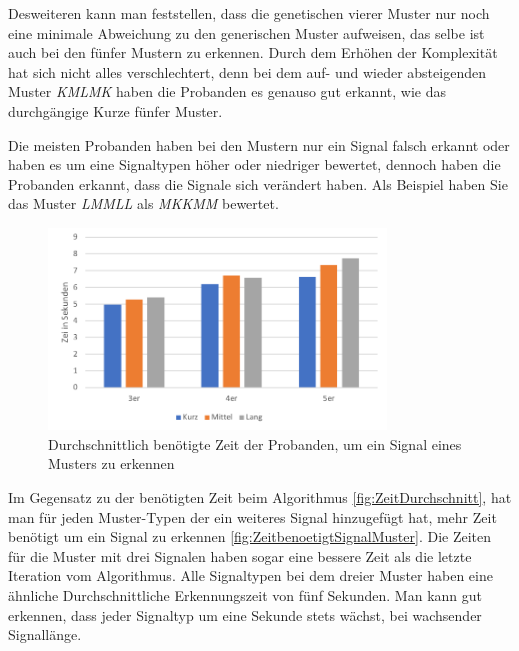 Desweiteren kann man feststellen, dass die genetischen vierer Muster nur noch eine minimale Abweichung zu den generischen Muster aufweisen, das selbe ist auch bei den f{\"u}nfer Mustern zu erkennen.
Durch dem Erh{\"o}hen der Komplexit{\"a}t hat sich nicht alles verschlechtert, denn bei dem auf- und wieder absteigenden Muster \textit{KMLMK} haben die Probanden es genauso gut erkannt, wie das durchg{\"a}ngige Kurze f{\"u}nfer Muster. 

Die meisten Probanden haben bei den Mustern nur ein Signal falsch erkannt oder haben es um eine Signaltypen h{\"o}her oder niedriger bewertet, dennoch haben die Probanden erkannt, dass die Signale sich ver{\"a}ndert haben. Als Beispiel haben Sie das Muster \textit{LMMLL} als \textit{MKKMM} bewertet. \\

\begin{figure}[htbp] 
            \centering
   	\includegraphics[width=0.8\textwidth]{pics/analyse/algo/ZeitbenoetigtSignalMuster.png}
	\caption{Durchschnittlich ben{\"o}tigte Zeit der Probanden, um ein Signal eines Musters zu erkennen}
	\label{fig:ZeitbenoetigtSignalMuster}
\end{figure}

Im Gegensatz zu der ben{\"o}tigten Zeit beim Algorithmus \autoref{fig:ZeitDurchschnitt}, hat man f{\"u}r jeden Muster-Typen der ein weiteres Signal hinzugef{\"u}gt hat, mehr Zeit ben{\"o}tigt um ein Signal zu erkennen \autoref{fig:ZeitbenoetigtSignalMuster}. 
Die Zeiten f{\"u}r die Muster mit drei Signalen haben sogar eine bessere Zeit als die letzte Iteration vom Algorithmus. 
Alle Signaltypen bei dem dreier Muster haben eine {\"a}hnliche Durchschnittliche Erkennungszeit von f{\"u}nf Sekunden.
Man kann gut erkennen, dass jeder Signaltyp um eine Sekunde stets w{\"a}chst, bei wachsender Signall{\"a}nge.

